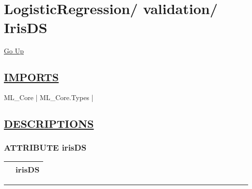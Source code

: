 \chapter*{\color{headfile}
{\large LogisticRegression\slash\hspace{0pt}}
{\large validation\slash\hspace{0pt}}
 \\
IrisDS
}
\hypertarget{ecldoc:toc:LogisticRegression.validation.IrisDS}{}
\hyperlink{ecldoc:toc:root/LogisticRegression/validation}{Go Up}

\section*{\underline{\textsf{IMPORTS}}}
\begin{doublespace}
{\large
ML\_Core |
ML\_Core.Types |
}
\end{doublespace}

\section*{\underline{\textsf{DESCRIPTIONS}}}
\subsection*{\textsf{\colorbox{headtoc}{\color{white} ATTRIBUTE}
irisDS}}

\hypertarget{ecldoc:logisticregression.validation.irisds}{}

{\renewcommand{\arraystretch}{1.5}
\begin{tabularx}{\textwidth}{|>{\raggedright\arraybackslash}l|X|}
\hline
\hspace{0pt}\mytexttt{\color{red} } & \textbf{irisDS} \\
\hline
\end{tabularx}
}

\par


\rule{\linewidth}{0.5pt}

